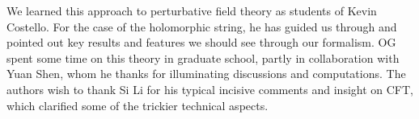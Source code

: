 We learned this approach to perturbative field theory as students of Kevin Costello.
For the case of the holomorphic string, he has guided us through and pointed out key results and features we should see through our formalism. 
OG spent some time on this theory in graduate school,
partly in collaboration with Yuan Shen,
whom he thanks for illuminating discussions and computations.
The authors wish to thank Si Li for his typical incisive comments and insight on CFT,
which clarified some of the trickier technical aspects.

